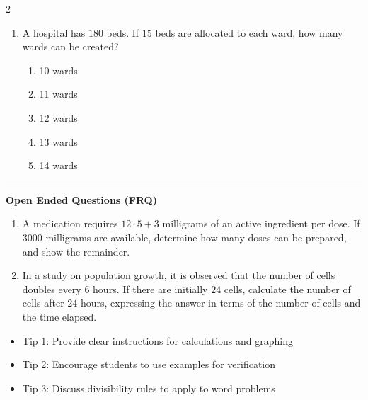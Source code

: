 \documentclass[10pt]{article}
\begin{document}
\begin{multicols}{2}
\begin{enumerate}[label=\textbf{Q\arabic*.}, leftmargin=*, itemsep=6pt, parsep=0pt]
  \item \small A hospital has $180$ beds. If $15$ beds are allocated to each ward, how many wards can be created?
  \begin{enumerate}[label=(\Alph*), leftmargin=0.6cm, nosep, itemsep=2pt]
    \item 10 wards
    \item 11 wards
    \item 12 wards
    \item 13 wards
    \item 14 wards
  \end{enumerate}

\end{enumerate}
\end{multicols}

\vspace{-0.2cm}
\hrule
\vspace{0.2cm}
\textbf{\small Open Ended Questions (FRQ)}
\begin{enumerate}[label=\textbf{Q\arabic*.}, start=9, itemsep=5pt, topsep=0pt]

  \item \small A medication requires $12 \cdot 5 + 3$ milligrams of an active ingredient per dose. If $3000$ milligrams are available, determine how many doses can be prepared, and show the remainder. \vspace{2cm}

  \item \small In a study on population growth, it is observed that the number of cells doubles every $6$ hours. If there are initially $24$ cells, calculate the number of cells after $24$ hours, expressing the answer in terms of the number of cells and the time elapsed. \vspace{2cm}

\end{enumerate}

\vfill

\begin{tcolorbox}[colback=blue!5, colframe=mainblue!50, title=\small \textbf{Chef's Tips}, fonttitle=\bfseries, bottom=1mm]
\begin{itemize}[noitemsep, topsep=2pt, leftmargin=0.5cm]
  \item \scriptsize Tip 1: Provide clear instructions for calculations and graphing\item \scriptsize Tip 2: Encourage students to use examples for verification\item \scriptsize Tip 3: Discuss divisibility rules to apply to word problems
\end{itemize}
\end{tcolorbox}
\end{document}

